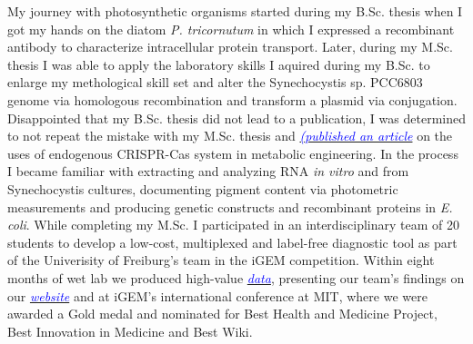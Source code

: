 \documentclass[11pt,a4paper,sans]{moderncv}
\begin{document}
\begin{spacing}{1.15}
My journey with photosynthetic organisms started during my B.Sc. thesis when I got my hands on the diatom \textit{P. tricornutum} in which I expressed a recombinant antibody to characterize intracellular protein transport. 
Later, during my M.Sc. thesis I was able to apply the laboratory skills I aquired during my B.Sc. to enlarge my methological skill set and alter the Synechocystis sp. PCC6803 genome via homologous recombination and transform a plasmid via conjugation. 
Disappointed that my B.Sc. thesis did not lead to a publication, I was determined to not repeat the mistake with my M.Sc. thesis and {\href{https://www.tandfonline.com/eprint/vmAQ3vjYGdZIZpIKQTIT/full}{\textcolor{blue}{{\textit{(published an article}}}}} on the uses of endogenous CRISPR-Cas system in metabolic engineering.
In the process I became familiar with extracting and analyzing RNA \textit{in vitro} and from Synechocystis cultures, documenting pigment content via photometric measurements and producing genetic constructs and recombinant proteins in \textit{E. coli}. 
While completing my M.Sc. I participated in an interdisciplinary team of 20 students to develop a low-cost, multiplexed and label-free diagnostic tool as part of the Univerisity of Freiburg's team in the iGEM competition.
Within eight months of wet lab we produced high-value {\href{https://www.ncbi.nlm.nih.gov/pubmed/29803867}{\textcolor{blue}{\textit{data}}}}, presenting our team's findings on our {\href{http://2015.igem.org/Team:Freiburg}{\textcolor{blue}{\textit{website}}}} and at iGEM's international conference at MIT, where we were awarded a Gold medal and nominated for Best Health and Medicine Project, Best Innovation in Medicine and Best Wiki.

\end{spacing}
\end{document}
